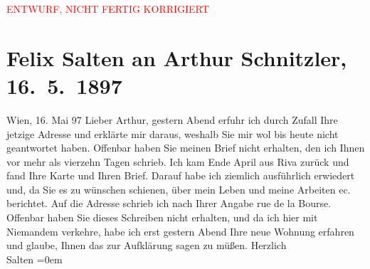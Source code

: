 
\begin{center}
            \textcolor{red}{ENTWURF, NICHT FERTIG KORRIGIERT}
                      \end{center}
            
         \renewcommand{\erwaehnteOrte}{Orte: Paris, Riva del Garda, Wien, rue de la Bourse}
         \renewcommand{\erwaehnteWerke}{}
               \section[Felix Salten an Arthur Schnitzler, 16. 5. 1897]{ Felix Salten an Arthur Schnitzler, 16. 5. 1897}\nopagebreak{}\rehead{ }\begin{ledgroupsized}[t]{13cm}\normalsize\beginnumbering \toendnotes[C]{\smallbreak\pagebreak[2]} 
\pstart
           \raggedleft{}{\pb}Wien, 16. Mai 97\pend
           \pstart
           Lieber Arthur, gestern Abend erfuhr ich durch Zufall Ihre jetzige
               Adresse und erklärte mir daraus, weshalb Sie mir wol bis heute nicht geantwortet
               haben. Offenbar haben Sie meinen Brief nicht erhalten, den ich Ihnen vor mehr als
               vierzehn Tagen schrieb. Ich kam Ende April aus Riva zurück und fand Ihre Karte und Ihren Brief. Darauf habe ich ziemlich
               ausführlich erwiedert und, da Sie es zu wünschen schienen, über mein Leben und meine
               Arbeiten ec. berichtet. Auf die Adresse schrieb ich nach Ihrer Angabe rue de la Bourse. Offenbar haben Sie dieses
               Schreiben nicht erhalten, und da ich hier mit Niemandem verkehre, habe ich erst
               gestern Abend Ihre neue Wohnung erfahren und glaube, Ihnen das zur Aufklärung sagen
               zu müßen.\pend
           \pstart
           Herzlich {\\[\baselineskip]}\spacefill\mbox{Salten}\pend
           \leftskip=0em{}
         
         \endnumbering{}\end{ledgroupsized}\begin{anhang}\end{anhang}\newcommand{\dateiname}{L03265}\newcommand{\titel}{Felix Salten an Arthur Schnitzler, 16. 5. 1897}\newcommand{\editorInnen}{Martin Anton Müller und Laura Untner}
      